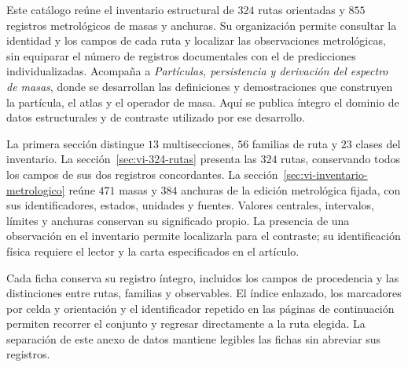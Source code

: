 \documentclass[a4paper,10pt]{article}
\begin{document}
\begin{minipage}{\textwidth}
Este catálogo reúne el inventario estructural de \(324\) rutas orientadas
y \(855\) registros metrológicos de masas y anchuras. Su organización
permite consultar la identidad y los campos de cada ruta y localizar las
observaciones metrológicas, sin equiparar el número de registros documentales con el
de predicciones individualizadas. Acompaña a \emph{Partículas,
persistencia y derivación del espectro de masas}, donde se desarrollan
las definiciones y demostraciones que construyen la partícula, el atlas
y el operador de masa. Aquí se publica íntegro el dominio de datos
estructurales y de contraste utilizado por ese desarrollo.

La primera sección distingue \(13\) multisecciones, \(56\) familias de
ruta y \(23\) clases del inventario. La
sección~\ref{sec:vi-324-rutas} presenta las \(324\) rutas, conservando
todos los campos de sus dos registros concordantes. La
sección~\ref{sec:vi-inventario-metrologico} reúne \(471\) masas y
\(384\) anchuras de la edición metrológica fijada, con sus identificadores,
estados, unidades y fuentes. Valores centrales, intervalos, límites y
anchuras conservan su significado propio. La presencia de una
observación en el inventario permite localizarla para el contraste;
su identificación física requiere el lector y la carta especificados
en el artículo.

Cada ficha conserva su registro íntegro, incluidos los campos de
procedencia y las distinciones entre rutas, familias y observables. El
índice enlazado, los marcadores por celda y orientación y el identificador
repetido en las páginas de continuación permiten recorrer el conjunto y
regresar directamente a la ruta elegida. La separación de este anexo de
datos mantiene legibles las fichas sin abreviar sus registros.\par
\end{minipage}
\par\endgroup
\clearpage
\tableofcontents
\clearpage



\end{document}
